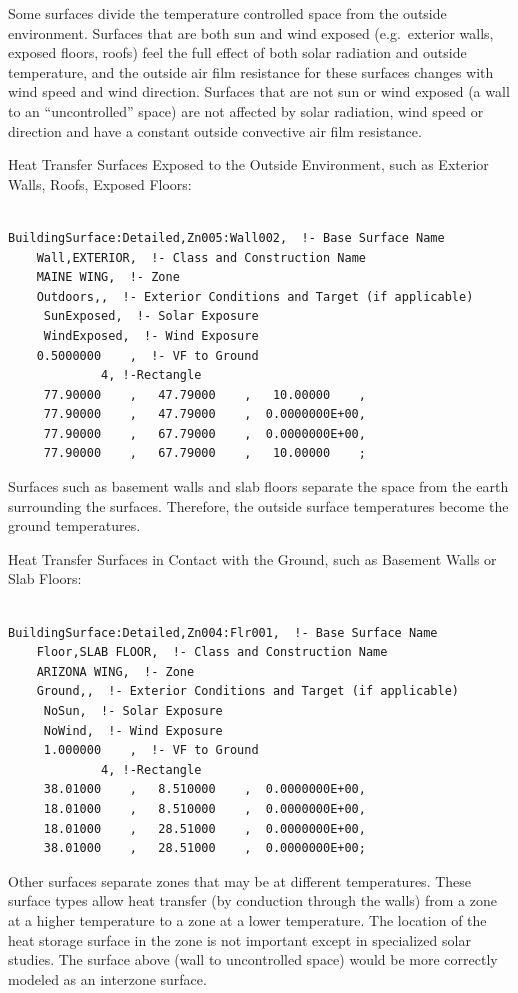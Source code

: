 Some surfaces divide the temperature controlled space from the outside environment. Surfaces that are both sun and wind exposed (e.g.~exterior walls, exposed floors, roofs) feel the full effect of both solar radiation and outside temperature, and the outside air film resistance for these surfaces changes with wind speed and wind direction. Surfaces that are not sun or wind exposed (a wall to an ``uncontrolled'' space) are not affected by solar radiation, wind speed or direction and have a constant outside convective air film resistance.

Heat Transfer Surfaces Exposed to the Outside Environment, such as Exterior Walls, Roofs, Exposed Floors:

\begin{lstlisting}

BuildingSurface:Detailed,Zn005:Wall002,  !- Base Surface Name
    Wall,EXTERIOR,  !- Class and Construction Name
    MAINE WING,  !- Zone
    Outdoors,,  !- Exterior Conditions and Target (if applicable)
     SunExposed,  !- Solar Exposure
     WindExposed,  !- Wind Exposure
    0.5000000    ,  !- VF to Ground
             4, !-Rectangle
     77.90000    ,   47.79000    ,   10.00000    ,
     77.90000    ,   47.79000    ,  0.0000000E+00,
     77.90000    ,   67.79000    ,  0.0000000E+00,
     77.90000    ,   67.79000    ,   10.00000    ;
\end{lstlisting}

Surfaces such as basement walls and slab floors separate the space from the earth surrounding the surfaces. Therefore, the outside surface temperatures become the ground temperatures.

Heat Transfer Surfaces in Contact with the Ground, such as Basement Walls or Slab Floors:

\begin{lstlisting}

BuildingSurface:Detailed,Zn004:Flr001,  !- Base Surface Name
    Floor,SLAB FLOOR,  !- Class and Construction Name
    ARIZONA WING,  !- Zone
    Ground,,  !- Exterior Conditions and Target (if applicable)
     NoSun,  !- Solar Exposure
     NoWind,  !- Wind Exposure
     1.000000    ,  !- VF to Ground
             4, !-Rectangle
     38.01000    ,   8.510000    ,  0.0000000E+00,
     18.01000    ,   8.510000    ,  0.0000000E+00,
     18.01000    ,   28.51000    ,  0.0000000E+00,
     38.01000    ,   28.51000    ,  0.0000000E+00;
\end{lstlisting}

Other surfaces separate zones that may be at different temperatures. These surface types allow heat transfer (by conduction through the walls) from a zone at a higher temperature to a zone at a lower temperature. The location of the heat storage surface in the zone is not important except in specialized solar studies. The surface above (wall to uncontrolled space) would be more correctly modeled as an interzone surface.

